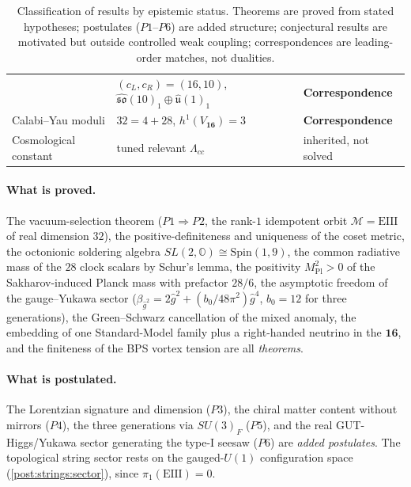 \begin{table}[h]
\begin{tabular}{lll}
  & $(c_{L},c_{R})=(16,10)$, $\widehat{\mathfrak{so}}(10)_{1}\oplus\widehat{\mathfrak u}(1)_{1}$
  & \textbf{Correspondence}\\
Calabi--Yau moduli
  & $32=4+28$, $h^{1}(V_{\mathbf{16}})=3$
  & \textbf{Correspondence}\\
Cosmological constant
  & tuned relevant $\Lambda_{cc}$
  & inherited, not solved\\
\hline
\end{tabular}
\caption{Classification of results by epistemic status. Theorems are
proved from stated hypotheses; postulates ($P1$--$P6$) are added
structure; conjectural results are motivated but outside controlled
weak coupling; correspondences are leading-order matches, not
dualities.}
\label{tab:strings:ledger}
\end{table}

\paragraph{What is proved.}
The vacuum-selection theorem ($P1\Rightarrow P2$, the rank-$1$
idempotent orbit $\mathcal{M}=\mathrm{EIII}$ of real dimension $32$), the
positive-definiteness and uniqueness of the coset metric, the octonionic
soldering algebra $SL(2,\mathbb{O})\cong\mathrm{Spin}(1,9)$, the common
radiative mass of the $28$ clock scalars by Schur's lemma, the positivity
$M_{\mathrm{Pl}}^{2}>0$ of the Sakharov-induced Planck mass with
prefactor $28/6$, the asymptotic freedom of the gauge--Yukawa sector
($\beta_{\hat g^{2}}=2\hat g^{2}+(b_{0}/48\pi^{2})\hat g^{4}$,
$b_{0}=12$ for three generations), the Green--Schwarz cancellation of the
mixed anomaly, the embedding of one Standard-Model family plus a
right-handed neutrino in the $\mathbf{16}$, and the finiteness of the BPS
vortex tension are all \emph{theorems}.

\paragraph{What is postulated.}
The Lorentzian signature and dimension ($P3$), the chiral matter content
without mirrors ($P4$), the three generations via $SU(3)_{F}$ ($P5$), and
the real GUT-Higgs/Yukawa sector generating the type-I seesaw ($P6$) are
\emph{added postulates}. The topological string sector rests on the
gauged-$U(1)$ configuration space (\autoref{post:strings:sector}), since
$\pi_{1}(\mathrm{EIII})=0$.

